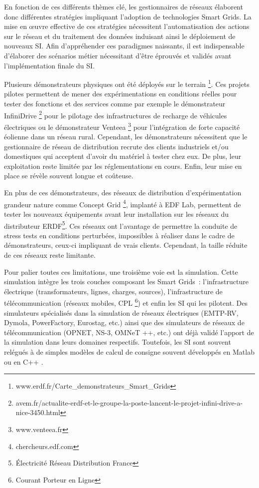 En fonction de ces différents thèmes clé, les gestionnaires de réseaux élaborent 
donc différentes stratégies impliquant l'adoption de technologies Smart Grids. 
La mise en œuvre effective de ces stratégies nécessitent l'automatisation des 
actions sur le réseau et du traitement des données induisant ainsi le 
déploiement de nouveaux SI. Afin d'appréhender ces paradigmes naissants, il est 
indispensable d'élaborer des scénarios métier nécessitant d'être éprouvés et 
validés avant l'implémentation finale du SI.

Plusieurs démonstrateurs physiques ont été déployés sur le terrain 
\footnote{www.erdf.fr/Carte\_demonstrateurs\_Smart\_Grids}. Ces projets pilotes 
permettent de mener des expérimentations en conditions réelles pour tester des 
fonctions et des services comme par exemple le démonstrateur InfiniDrive 
\footnote{avem.fr/actualite-erdf-et-le-groupe-la-poste-lancent-le-projet-infini-drive-a-nice-3450.html} 
pour le pilotage des infrastructures de recharge de véhicules électriques ou le 
démonstrateur Venteea \footnote{www.venteea.fr} pour l'intégration de forte 
capacité éolienne dans un réseau rural. Cependant, les démonstrateurs 
nécessitent que le gestionnaire de réseau de distribution recrute des clients 
industriels et/ou domestiques qui acceptent d'avoir du matériel à tester chez 
eux. De plus, leur exploitation reste limitée par les réglementations en cours. 
Enfin, leur mise en place se révèle souvent longue et coûteuse. 

En plus de ces démonstrateurs, des réseaux de distribution d'expérimentation 
grandeur nature comme Concept Grid \footnote{chercheurs.edf.com}, implanté à EDF 
Lab, permettent de tester les nouveaux équipements avant leur installation sur 
les réseaux du distributeur ERDF\footnote{Électricité Réseau Distribution 
France}. Ces réseaux ont l'avantage de permettre la conduite de stress tests en 
conditions perturbées, impossibles à réaliser dans le cadre de démonstrateurs, 
ceux-ci impliquant de vrais clients. Cependant, la taille réduite de ces réseaux 
reste limitante.

Pour palier toutes ces limitations, une troisième voie est la simulation. Cette 
simulation intègre les trois couches composant les Smart Grids~: 
l'infrastructure électrique (transformateurs, lignes, charges, sources), 
l'infrastructure de télécommunication (réseaux mobiles, CPL \footnote{Courant 
Porteur en Ligne}) et enfin les SI qui les pilotent. Des simulateurs spécialisés 
dans la simulation de réseaux électriques (EMTP-RV, Dymola, PowerFactory, 
Eurostag, etc.) ainsi que des simulateurs de réseaux de télécommunication 
(OPNET, NS-3, OMNeT ++, etc.) ont déjà validé l'apport de la simulation dans 
leurs domaines respectifs. Toutefois, les SI sont souvent relégués à de simples 
modèles de calcul de consigne souvent développés en Matlab ou en C++ 
\cite{palensky2014simulating}. 

